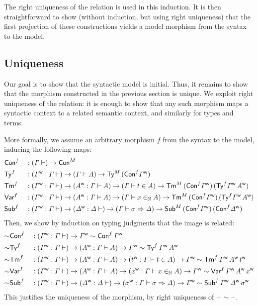   The right uniqueness of the relation is used in this induction. It is then
straightforward to show (without induction, but using right uniqueness) that the
first projection of these constructions yields a model morphism from the syntax
to the model.

\subsection{Uniqueness}
Our goal is to show that the syntactic model is initial. Thus, it remains to
show that the morphism constructed in the previous section is unique. We exploit
right uniqueness of the relation: it is enough to show that any such morphism
maps a syntactic context to a related semantic context, and similarly for types
and terms.

More formally, we assume an arbitrary morphism $f$ from the
syntax to the model, inducing the following maps:
\begin{alignat*}{5}
  &
  \mor{\Con}
  && :
   (\GG \vdash) \ra \model\Con
   \\
  &
  \mor{\Ty}
  && :
   (\wf\GG:\GG \vdash) \ra (\GG\vdash A)\ra\model\Ty\,(\mor\Con\wf\GG)
   \\
  &
  \mor{\Tm}
  && :
  (\wf\GG:\GG \vdash) \ra (\wf{A}:\GG\vdash A)\ra
  (\GG\vdash t \in A)\ra\model\Tm\,(\mor\Con\wf\GG)\,
  (\mor\Ty\wf\GG\,\wf{A})
   \\
  &
  \mor{\Var}
  && :
  (\wf\GG:\GG \vdash) \ra (\wf{A}:\GG\vdash A)\ra
  (\GG\vdash x \invar A)\ra\model\Tm\,(\mor\Con\wf\GG)\,
  (\mor\Ty\wf\GG\,\wf{A})
   \\
  &
  \mor{\Sub}
  && :
  (\wf\GG:\GG \vdash) \ra
  (\wf\GD:\GD \vdash) \ra
  (\GG\vdash \sigma \Rightarrow \GD)\ra\model\Sub\,(\mor\Con\wf\GG)\,
  (\mor\Con\wf\GD)
\end{alignat*}
Then, we show by induction on typing judgments that
the image is related:
\begin{alignat*}{5}
  &
  {\sim}\mor{\Con}
  && :
  (\wf\GG : \GG \vdash) \ra \wf\GG\sim \mor\Con\,\wf\GG
  \\
  &
  {\sim}\mor{\Ty}
  && :
  (\wf\GG : \GG \vdash) \ra
  (\wf{A} : \GG \vdash A) \ra
  \wf\GG\sim \mor\Ty\,\wf\GG\,\wf{A}
  \\
  &
  {\sim}\mor{\Tm}
  && :
  (\wf\GG : \GG \vdash) \ra
  (\wf{A} : \GG \vdash A) \ra
  (\wf{t} : \GG \vdash t \in A) \ra
  \wf\GG\sim \mor\Tm\,\wf\GG\,\wf{A}\,\wf{t}
  \\
  &
  {\sim}\mor{\Var}
  && :
  (\wf\GG : \GG \vdash) \ra
  (\wf{A} : \GG \vdash A) \ra
  (\wf{x} : \GG \vdash x \invar A) \ra
  \wf\GG\sim \mor\Var\,\wf\GG\,\wf{A}\,\wf{x}
  \\
  &
  {\sim}\mor{\Sub}
  && :
  (\wf\GG : \GG \vdash) \ra
  (\wf{\GD} : \GD \vdash) \ra
  (\wf{\sigma} : \GG \vdash \sigma \Rightarrow \GD) \ra
  \wf\GG\sim \mor\Sub\,\wf\GG\,\wf{\GD}\,\wf{\sigma}
\end{alignat*}
This justifies the uniqueness of the morphism, by right uniqueness of
$\blank\sim\blank$.


